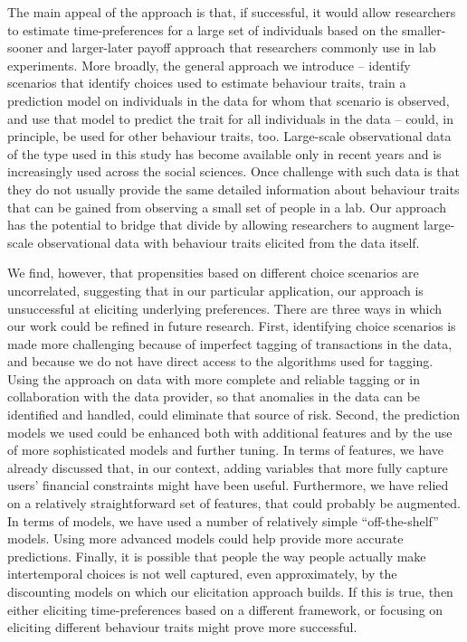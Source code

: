 The main appeal of the approach is that, if successful, it would allow
researchers to estimate time-preferences for a large set of individuals based
on the smaller-sooner and larger-later payoff approach that researchers
commonly use in lab experiments. More broadly, the general approach we
introduce -- identify scenarios that identify choices used to estimate
behaviour traits, train a prediction model on individuals in the data for whom
that scenario is observed, and use that model to predict the trait for all
individuals in the data -- could, in principle, be used for other behaviour
traits, too. Large-scale observational data of the type used in this study has
become available only in recent years and is increasingly used across the
social sciences. Once challenge with such data is that they do not usually
provide the same detailed information about behaviour traits that can be gained
from observing a small set of people in a lab. Our approach has the potential
to bridge that divide by allowing researchers to augment large-scale
observational data with behaviour traits elicited from the data itself.

We find, however, that propensities based on different choice scenarios are
uncorrelated, suggesting that in our particular application, our approach is
unsuccessful at eliciting underlying preferences. There are three ways in which
our work could be refined in future research. First, identifying choice
scenarios is made more challenging because of imperfect tagging of transactions
in the data, and because we do not have direct access to the algorithms used
for tagging. Using the approach on data with more complete and reliable tagging
or in collaboration with the data provider, so that anomalies in the data can
be identified and handled, could eliminate that source of risk. Second, the
prediction models we used could be enhanced both with additional features and
by the use of more sophisticated models and further tuning. In terms of
features, we have already discussed that, in our context, adding variables that
more fully capture users' financial constraints might have been useful.
Furthermore, we have relied on a relatively straightforward set of features,
that could probably be augmented. In terms of models, we have used a number of
relatively simple ``off-the-shelf'' models. Using more advanced models could
help provide more accurate predictions. Finally, it is possible that people the
way people actually make intertemporal choices is not well captured, even
approximately, by the discounting models on which our elicitation approach
builds. If this is true, then either eliciting time-preferences based on a
different framework, or focusing on eliciting different behaviour traits might
prove more successful.

